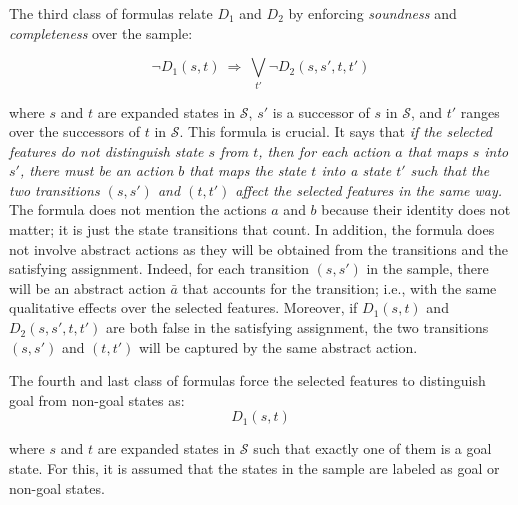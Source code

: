 \documentclass[letterpaper]{article} %
\newcommand{\Omit}[1]{}
\renewcommand{\S}{\mathcal{S}}
\begin{document}
The third class of formulas relate $D_1$ and $D_2$ by enforcing \emph{soundness}
and \emph{completeness} over  the sample: %
\Omit{
Since the abstract actions  are not given,
the qualitative changes in each  transition $(s,s')$ in $\S$
are  taken as templates  of abstract actions. Thus, if $s$ and $t$ are not distinguished by the selected features,
for each transition $(s, s') \in \S$, there must be a transition $(t, t') \in \S$
such that the two transitions are not distinguished by the selected features either.
This is expressed as
}
%
\begin{equation}
  \label{eq:bridge1}
  \neg D_1(s, t) \  \Rightarrow\ \textstyle\bigvee_{t'} \neg D_2(s, s', t, t')
\end{equation}

\noindent where $s$ and $t$ are expanded states in  $\S$, $s'$ is a successor of $s$ in $\S$,
and $t'$ ranges over the successors of $t$ in $\S$. This formula is crucial.
It says that \emph{if the selected features do not distinguish state $s$ from $t$,
then for each action $a$ that maps  $s$ into $s'$, there must be an action $b$ that maps the state
$t$ into a state $t'$ such that the two transitions $(s,s')$ and $(t,t')$ affect the selected features
in the same way.} The formula does not mention the actions $a$ and $b$ because their identity does not matter;
it is just the state transitions that count. In addition, the formula does not involve abstract actions as they
will be obtained from the transitions and  the satisfying assignment. Indeed, for each transition $(s,s')$ in the sample, there will be
an abstract action $\bar{a}$ that  accounts for the transition; i.e., with the  same qualitative effects over the selected features.
Moreover, if $D_1(s,t)$ and $D_2(s,s',t,t')$ are both false in the satisfying assignment, the two transitions $(s,s')$ and $(t,t')$
will be captured by the same abstract action.


The fourth and  last class of formulas force the selected features to distinguish goal from non-goal states as:
\begin{equation}
  \label{eq:goal}
  D_1(s,t)
\end{equation}

\noindent where  $s$ and $t$  are expanded states  in $\S$ such that exactly one of them is a goal state.
For this, it is assumed that the states in the sample are labeled as goal or non-goal states.
\end{document}
